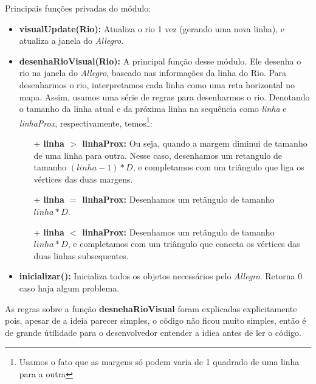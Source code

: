 \documentclass[11pt]{article}
\begin{document}
Principais funções privadas do módulo:
\begin{itemize}

\item \textbf{visualUpdate({\color{red}Rio}):} Atualiza o rio 1 vez (gerando uma nova linha), e atualiza a janela do \emph{Allegro}.

\item \textbf{desenhaRioVisual({\color{red}Rio}):} A principal função desse módulo. Ele desenha o rio na janela do \emph{Allegro}, baseado nas informações da linha do Rio. Para desenharmos o rio, interpretamos cada linha como uma reta horizontal no mapa.
Assim, usamos uma série de regras para desenharmos o rio. Denotando o tamanho da linha atual e da próxima linha na sequência como \emph{linha} e \emph{linhaProx}, respectivamente, temos\footnote{Usamos o fato que as margens só podem varia de 1 quadrado de uma linha para a outra}:
	\begin{itemize}
	
	\item[+] \textbf{linha $>$ linhaProx:} Ou seja, quando a margem 	diminui de tamanho de uma linha para outra. Nesse caso, desenhamos um retangulo de tamanho $(linha-1)*D$, e completamos com um triângulo que liga os vértices das duas margens.
	
	\item[+] \textbf{linha $=$ linhaProx:} Desenhamos um retângulo de tamanho $linha*D$.
	
	\item[+] \textbf{linha $<$ linhaProx:} Desenhamos um retângulo de tamanho $linha*D$, e completamos com um triângulo que conecta os vértices das duas linhas subsequentes.
	
	\end{itemize}
	
\item \textbf{inicializar():} Inicializa todos os objetos necessários pelo \emph{Allegro}. Retorna 0 caso haja algum problema.


\end{itemize}

As regras sobre a função \textbf{desnehaRioVisual} foram explicadas explicitamente pois, apesar de a ideia parecer simples, o código não ficou muito simples, então é de grande útilidade para o desenvolvedor entender a idiea antes de ler o código.
\end{document}
